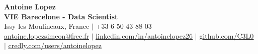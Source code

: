 \documentclass[letterpaper,10pt]{article}
\begin{document}
\begin{center}
    {\Huge \textbf{Antoine Lopez}} \\ \vspace{2pt}
    {\large \textbf{VIE Barecelone - Data Scientist}} \\ \vspace{3pt}
    \small
    Issy-les-Moulineaux, France $|$ +33 6 50 43 88 03 \\
    \href{mailto:antoine.lopezsimeon@free.fr}{\underline{antoine.lopezsimeon@free.fr}} $|$ 
    \href{https://linkedin.com/in/antoinelopez26}{\underline{linkedin.com/in/antoinelopez26}} $|$
    \href{https://github.com/C3L0}{\underline{github.com/C3L0}} $|$
    \href{https://www.credly.com/users/antoinelopez26}{\underline{credly.com/users/antoinelopez}}
\end{center}

\vspace{-10pt}







\end{document}
